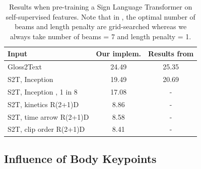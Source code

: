 \documentclass[final]{cvpr}
\begin{document}
\begin{table}[H]
	\centering
	\def\arraystretch{0.9}
	\setlength{\tabcolsep}{0.2em}
	\begin{tabular}{l c c}
		\toprule
		Input   & Our implem.   & Results from \cite{neccam} \\
		\midrule
		Gloss2Text   &  24.49 & 25.35 \\
		S2T, Inception \cite{hmm}   &  19.49 & 20.69  \\
		S2T, Inception \cite{hmm}, 1 in 8   &  17.08  &  -  \\
		S2T, kinetics R(2+1)D &  8.86 &  -  \\
		S2T, time arrow R(2+1)D  &  8.58 & - \\
		S2T, clip order R(2+1)D  &  8.41 & - \\
		\bottomrule
	\end{tabular}
	\caption{Results when pre-training a Sign Language Transformer on self-supervised features. Note that in \cite{neccam}, the optimal number of beams and length penalty are grid-searched whereas we always take number of beams = 7 and length penalty = 1. }
	\label{tab:self-sup}
\end{table}


\subsection{Influence of Body Keypoints}
\end{document}
